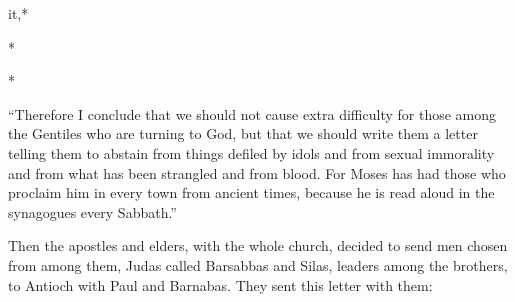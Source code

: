 {{{it,}}*
\par }{\Q {}*
\par }{*
{}
{}
\par }{\PP {}“Therefore
I
conclude
that we should not
cause extra difficulty
for those among
the Gentiles
who are turning
to
God,
but
that we should write
them
a letter telling them to abstain
from things defiled
by idols
and
from sexual immorality
and
from what has been strangled
and
from blood.
For
Moses
has had those who proclaim
him
in every
town
from
ancient
times,
because he is read
aloud in the synagogues
every
Sabbath.”
\par }{\PP {}Then
the apostles
and
elders,
with
the whole
church,
decided
to send
men
chosen
from among
them,
Judas
called
Barsabbas
and
Silas,
leaders
among
the brothers,
to
Antioch
with
Paul
and
Barnabas.
They sent
this letter with
them:

}
